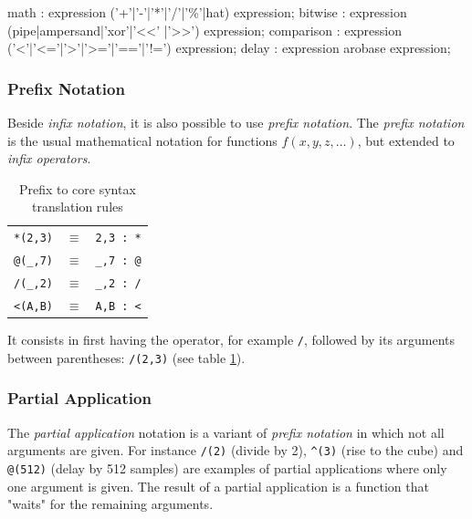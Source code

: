 \begin{rail}
math : expression ('+'|'-'|'*'|'/'|'\%'|hat) expression;
bitwise : expression (pipe|ampersand|'xor'|'<<' |'>>') expression;
comparison : expression ('<'|'<='|'>'|'>='|'=='|'!=') expression;
delay : expression arobase expression; 
\end{rail}

\subsubsection{Prefix Notation}

Beside \emph{infix notation}, it is also possible to use \emph{prefix notation}. 
The \emph{prefix notation} is the usual mathematical notation for functions $f(x,y,z,\ldots)$, but extended to \emph{infix operators}. 
%
\begin{table}[h!]
	\begin{center}
	\begin{tabular}{|rcl|}
	\hline
	\lstinline'*(2,3)' & $\equiv$ & \lstinline'2,3 : *'\\
	\lstinline'@(_,7)' & $\equiv$ & \lstinline'_,7 : @'\\
	\lstinline'/(_,2)' & $\equiv$ & \lstinline'_,2 : /'\\
	\lstinline'<(A,B)' & $\equiv$ & \lstinline'A,B : <'\\
	\hline
	\end{tabular}
	\end{center}
	\caption{Prefix to core syntax translation rules}
	\label{tab:prefixrules}
\end{table}

It consists in first having the operator, for example \lstinline'/', followed by its arguments between parentheses: \lstinline'/(2,3)' (see table \ref{tab:prefixrules}). 

\subsubsection{Partial Application}

The \emph{partial application} notation is a variant of \emph{prefix notation} in which not all arguments are given. For instance  \lstinline'/(2)' (divide by 2), \lstinline'^(3)'  (rise to the cube) and \lstinline'@(512)' (delay by 512 samples) are examples of partial applications where only one argument is given. The result of a partial application is a function that "waits" for the remaining arguments. 


